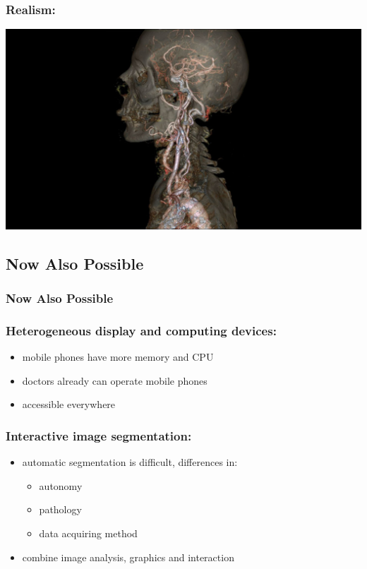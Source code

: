 \documentclass{beamer}
\begin{document}
\begin{frame}
	\frametitle{Realism:}
	\includegraphics[width=\textwidth]{images/realistic_transparent}
\end{frame}


\subsection{Now Also Possible}
\begin{frame}
	\frametitle{Now Also Possible}
\end{frame}

\begin{frame}
	\frametitle{Heterogeneous display and computing devices:}
	\begin{itemize}
		\item mobile phones have more memory and CPU
		\item doctors already can operate mobile phones
		\item accessible everywhere
	\end{itemize}
\end{frame}

\begin{frame}
	\frametitle{Interactive image segmentation:}
	\begin{itemize}
		\item automatic segmentation is difficult, differences in:
			\begin{itemize}
				\item autonomy
				\item pathology
				\item data acquiring method
			\end{itemize}
		\item combine image analysis, graphics and interaction
	\end{itemize}
\end{frame}
\end{document}
